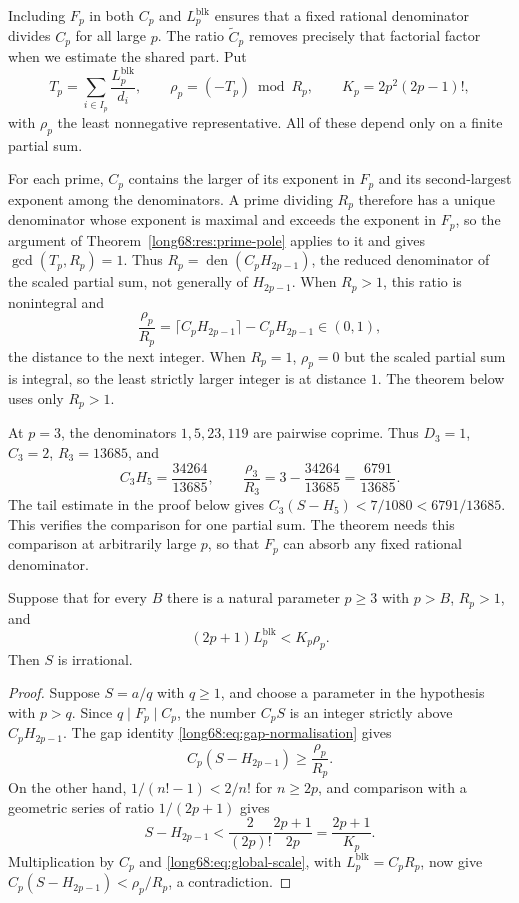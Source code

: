 \documentclass[11pt]{article}
\newcommand{\Ser}{S}
\newcommand{\Lc}{L}
\newcommand{\den}{\operatorname{den}}
\begin{document}
Including $F_p$ in both $C_p$ and $\Lc_p^{\mathrm{blk}}$ ensures that
a fixed rational denominator divides $C_p$ for all large $p$.
The ratio $\widetilde C_p$ removes precisely that factorial factor when
we estimate the shared part. Put
\[
 T_p=\sum_{i\in I_p}\frac{\Lc^{\mathrm{blk}}_p}{d_i},\qquad
 \rho_p=(-T_p)\bmod R_p,\qquad
 K_p=2p^2(2p-1)! ,
\]
with $\rho_p$ the least nonnegative representative.  All of these depend only
on a finite partial sum.

For each prime, $C_p$ contains the larger of its exponent in $F_p$ and
its second-largest exponent among the denominators.  A prime dividing $R_p$ therefore has a unique
denominator whose exponent is maximal and exceeds the exponent in $F_p$, so the argument of
Theorem~\ref{long68:res:prime-pole} applies to it and gives $\gcd(T_p,R_p)=1$.
Thus $R_p=\den(C_pH_{2p-1})$, the reduced denominator of the scaled
partial sum, not generally of $H_{2p-1}$. When $R_p>1$, this ratio is
nonintegral and
\begin{equation}\label{long68:eq:gap-normalisation}
 \frac{\rho_p}{R_p}
 =\bigl\lceil C_pH_{2p-1}\bigr\rceil-C_pH_{2p-1}\in(0,1),
\end{equation}
the distance to the next integer. When $R_p=1$, $\rho_p=0$ but the
scaled partial sum is integral, so the least strictly larger integer is at
distance $1$. The theorem below uses only $R_p>1$.

At $p=3$, the denominators $1,5,23,119$ are pairwise coprime. Thus $D_3=1$,
$C_3=2$, $R_3=13685$, and
\[
C_3H_5=\frac{34264}{13685},\qquad
\frac{\rho_3}{R_3}=3-\frac{34264}{13685}=\frac{6791}{13685}.
\]
The tail estimate in the proof below gives
$C_3(\Ser-H_5)<7/1080<6791/13685$. This verifies the comparison for one
partial sum. The theorem needs this comparison at arbitrarily large $p$,
so that $F_p$ can absorb any fixed rational denominator.

\begin{theorem}\label{long68:res:global-residue}
Suppose that for every $B$ there is a natural parameter $p\ge3$ with
$p>B$, $R_p>1$, and
\begin{equation}\label{long68:eq:global-scale}
 (2p+1)\Lc^{\mathrm{blk}}_p<K_p\rho_p .
\end{equation}
Then $\Ser$ is irrational.
\end{theorem}

\begin{proof}
Suppose $\Ser=a/q$ with $q\ge1$, and choose a parameter in the hypothesis
with $p>q$. Since $q\mid F_p\mid C_p$, the number $C_p\Ser$ is an integer
strictly above $C_pH_{2p-1}$. The gap identity
\eqref{long68:eq:gap-normalisation} gives
\[
 C_p(\Ser-H_{2p-1})\ge\frac{\rho_p}{R_p}.
\]
On the other hand, $1/(n!-1)<2/n!$ for $n\ge2p$, and comparison with a
geometric series of ratio $1/(2p+1)$ gives
\[
 \Ser-H_{2p-1}<\frac{2}{(2p)!}\frac{2p+1}{2p}=\frac{2p+1}{K_p}.
\]
Multiplication by $C_p$ and \eqref{long68:eq:global-scale}, with
$\Lc_p^{\mathrm{blk}}=C_pR_p$, now give
$C_p(\Ser-H_{2p-1})<\rho_p/R_p$, a contradiction.
\end{proof}
\end{document}
